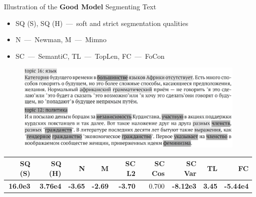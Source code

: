 \documentclass[russian]{beamer}
\begin{document}
\begin{frame}{Illustration of the \textbf{Good Model} Segmenting Text}
  \normalsize
  
  \begin{itemize}\setlength{\leftmargin}{0pt}
  \item SQ (S), SQ (H)~---~soft and strict segmentation qualities
  \item N~---~Newman, M~---~Mimno
  \item SC~---~SemantiC, TL~---~TopLen, FC~---~FoCon
  \end{itemize}

  \begin{figure}[h]
    \centering
    \includegraphics[width=\textwidth]{combine_good.jpg}
  \end{figure}
    
  \smallskip

  \begin{table}[h]
    \scriptsize
    \centering
    \begin{tabular}{rrrrrrrrr}
      SQ (S) & SQ (H) & N & M & SC L2 & SC Cos & SC Var & TL & FC\\
      \midrule
      \textbf{16.0e3} & \textbf{3.76e4} & \textbf{-3.65} & \textbf{-2.69} & \textbf{-3.70} & 0.700 & \textbf{-8.12e3} & \textbf{3.45} & \textbf{-5.44e4}
    \end{tabular}
  \end{table}
\end{frame}
\end{document}
